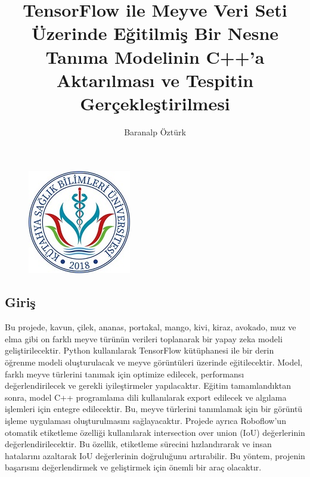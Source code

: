 \documentclass[12pt,a4paper]{article}
\date{}
\title{TensorFlow ile Meyve Veri Seti Üzerinde Eğitilmiş Bir Nesne Tanıma Modelinin C++'a Aktarılması ve Tespitin Gerçekleştirilmesi}
\author{Baranalp Öztürk}
\begin{document}
	\begin{figure}
		\centering
		\includegraphics{ksbu.jpg}
	\end{figure}
	\maketitle
	\maketitle
	\begin{center}
	\section*{Giriş}
	\end{center}
Bu projede, kavun, çilek, ananas, portakal, mango, kivi, kiraz, avokado, muz ve elma gibi on farklı meyve türünün verileri toplanarak bir yapay zeka modeli geliştirilecektir. Python kullanılarak TensorFlow kütüphanesi ile bir derin öğrenme modeli oluşturulacak ve meyve görüntüleri üzerinde eğitilecektir. Model, farklı meyve türlerini tanımak için optimize edilecek, performansı değerlendirilecek ve gerekli iyileştirmeler yapılacaktır. Eğitim tamamlandıktan sonra, model C++ programlama dili kullanılarak export edilecek ve algılama işlemleri için entegre edilecektir. Bu, meyve türlerini tanımlamak için bir görüntü işleme uygulaması oluşturulmasını sağlayacaktır. Projede ayrıca Roboflow'un otomatik etiketleme özelliği kullanılarak intersection over union (IoU) değerlerinin değerlendirilecektir. Bu özellik, etiketleme sürecini hızlandırarak ve insan hatalarını azaltarak IoU değerlerinin doğruluğunu artırabilir. Bu yöntem, projenin başarısını değerlendirmek ve geliştirmek için önemli bir araç olacaktır.
\end{document}
